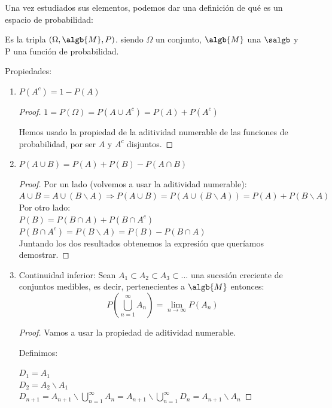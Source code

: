 \documentclass{apuntes}
\begin{document}
Una vez estudiados sus elementos, podemos dar una definición de qué es un espacio de probabilidad:

\begin{defn} Es la tripla $(\Omega, \algb{M}, P)$. siendo $\Omega$ un conjunto, $\algb{M}$ una $\salgb$ y P una función de probabilidad.
\end{defn}

Propiedades:
\begin{enumerate}
\item $P(A^c) = 1-P(A)$
\begin{proof}
$1=P(\Omega)=P(A \cup A^c) = P(A) + P(A^c)$

Hemos usado la propiedad de la aditividad numerable de las funciones de probabilidad, por ser $A$ y $A^c$ disjuntos.
\end{proof}
\item $P(A \cup B) = P(A) + P(B) - P(A \cap B)$
\begin{proof}

Por un lado (volvemos a usar la aditividad numerable):\\
$A \cup B = A \cup (B \backslash A) \Rightarrow P(A \cup B) = P(A \cup (B \backslash A)) = P(A) + P(B \backslash A)$\\

Por otro lado:\\
$P(B) = P(B \cap A) + P(B \cap A^c)$\\
$P(B \cap A^c) = P(B \backslash A) = P(B) - P(B \cap A)$ \\

Juntando los dos resultados obtenemos la expresión que queríamos demostrar.
\end{proof}

\item Continuidad inferior: Sean $A_1 \subset A_2 \subset A_3 \subset ...$ una sucesión creciente de conjuntos medibles, es decir, pertenecientes a $\algb{M}$ entonces:
\[ P(\bigcup_{n=1}^{\infty}A_n) = \lim_{n \rightarrow \infty} P(A_n)
\]


\begin{proof}
Vamos a usar la propiedad de aditividad numerable.

Definimos:

$D_1=A_1$\\
$D_2=A_2 \backslash A_1$\\
$D_{n+1}=A_{n+1} \backslash \bigcup_{n=1}^{\infty}A_n=A_{n+1} \backslash \bigcup_{n=1}^{\infty}D_n=A_{n+1} \backslash A_n$


\end{proof}
\end{enumerate}
\end{document}
